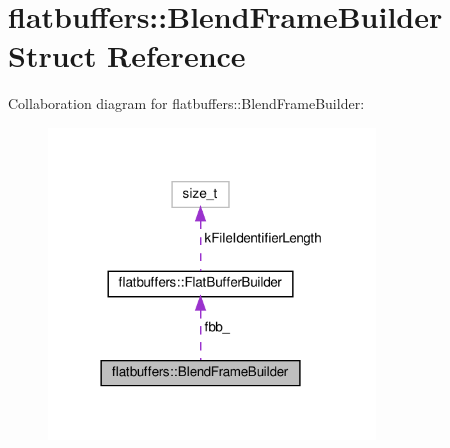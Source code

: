 \hypertarget{structflatbuffers_1_1BlendFrameBuilder}{}\section{flatbuffers\+:\+:Blend\+Frame\+Builder Struct Reference}
\label{structflatbuffers_1_1BlendFrameBuilder}


Collaboration diagram for flatbuffers\+:\+:Blend\+Frame\+Builder\+:
\nopagebreak
\begin{figure}[H]
\begin{center}
\leavevmode
\includegraphics[width=246pt]{structflatbuffers_1_1BlendFrameBuilder__coll__graph}
\end{center}
\end{figure}
